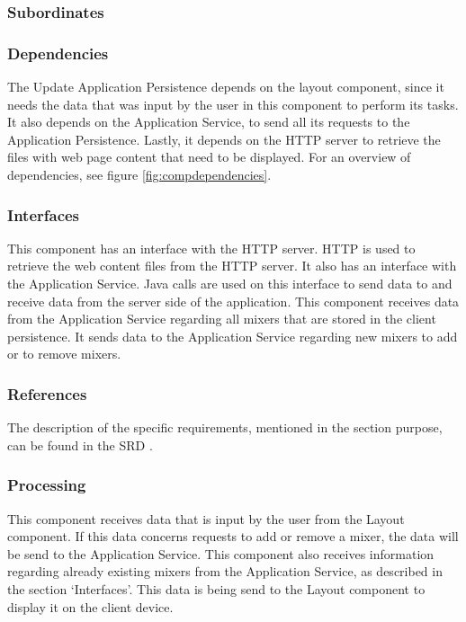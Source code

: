 \subsubsection*{Subordinates}

\subsubsection*{Dependencies}
The Update Application Persistence depends on the layout component, since it needs the data that was input by the user in this component to perform its tasks. It also depends on the Application Service, to send all its requests to the Application Persistence. Lastly, it depends on the HTTP server to retrieve the files with web page content that need to be displayed. For an overview of dependencies, see figure \ref{fig:compdependencies}.

\subsubsection*{Interfaces}
This component has an interface with the HTTP server. HTTP is used to retrieve the web content files from the HTTP server. It also has an interface with the Application Service. Java calls are used on this interface to send data to and receive data from the server side of the application. This component receives data from the Application Service regarding all mixers that are stored in the client persistence. It sends data to the Application Service regarding new mixers to add or to remove mixers.

\subsubsection*{References}
The description of the specific requirements, mentioned in the section purpose, can be found in the SRD \cite{srd}.

\subsubsection*{Processing}
This component receives data that is input by the user from the Layout component. If this data concerns requests to add or remove a mixer, the data will be send to the Application Service. This component also receives information regarding already existing mixers from the Application Service, as described in the section `Interfaces'. This data is being send to the Layout component to display it on the client device.

